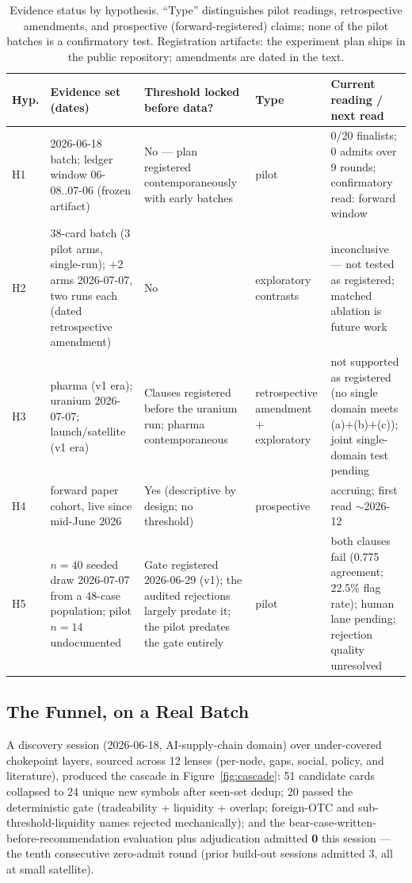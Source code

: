 \documentclass[11pt]{article}
\begin{document}
\begin{table}[h]
\centering
\footnotesize
\begin{tabularx}{\linewidth}{@{}lLLlL@{}}
\toprule
\textbf{Hyp.} & \textbf{Evidence set (dates)} & \textbf{Threshold locked before data?} &
\textbf{Type} & \textbf{Current reading / next read} \\
\midrule
H1 & 2026-06-18 batch; ledger window 06-08..07-06 (frozen artifact) & No --- plan registered
contemporaneously with early batches & pilot & 0/20 finalists; 0 admits over 9 rounds; confirmatory
read: forward window \\
H2 & 38-card batch (3 pilot arms, single-run); $+$2 arms 2026-07-07, two runs each (dated
retrospective amendment) & No & exploratory contrasts & inconclusive --- not tested as registered;
matched ablation is future work \\
H3 & pharma (v1 era); uranium 2026-07-07; launch/satellite (v1 era) & Clauses registered before the
uranium run; pharma contemporaneous & retrospective amendment $+$ exploratory & not supported as
registered (no single domain meets (a)$+$(b)$+$(c)); joint single-domain test pending \\
H4 & forward paper cohort, live since mid-June 2026 & Yes (descriptive by design; no threshold) &
prospective & accruing; first read $\sim$2026-12 \\
H5 & $n{=}40$ seeded draw 2026-07-07 from a 48-case population; pilot $n{=}14$ undocumented &
Gate registered 2026-06-29 (v1); the audited rejections largely predate it; the pilot predates the
gate entirely & pilot & both clauses fail (0.775 agreement; 22.5\% flag rate); human lane pending;
rejection quality unresolved \\
\bottomrule
\end{tabularx}
\caption{Evidence status by hypothesis. ``Type'' distinguishes pilot readings, retrospective
amendments, and prospective (forward-registered) claims; none of the pilot batches is a confirmatory
test. Registration artifacts: the experiment plan ships in the public repository; amendments are
dated in the text.}
\label{tab:evidence-status}
\end{table}

\subsection{The Funnel, on a Real Batch}

A discovery session (2026-06-18, AI-supply-chain domain) over under-covered
chokepoint layers, sourced across 12 lenses (per-node, gaps, social, policy, and
literature), produced the cascade in Figure~\ref{fig:cascade}: 51 candidate
cards collapsed to 24 unique new symbols after seen-set dedup; 20 passed the
deterministic gate (tradeability + liquidity + overlap; foreign-OTC and
sub-threshold-liquidity names rejected mechanically); and the
bear-case-written-before-recommendation evaluation plus adjudication admitted
\textbf{0} this session --- the tenth consecutive zero-admit round (prior
build-out sessions admitted 3, all at small satellite).
\end{document}
